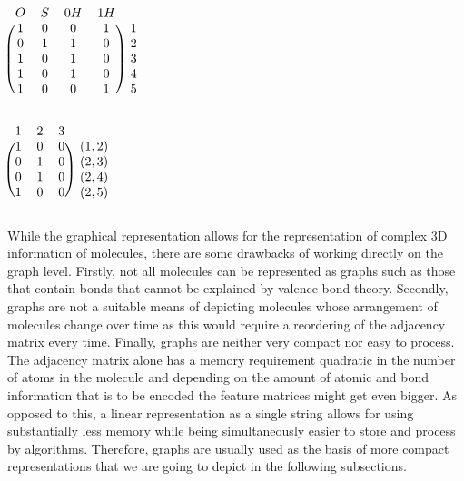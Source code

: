 \begin{minipage}{0.45\textwidth}
	\centering
	$
	\begin{blockarray}{ccccc}
	O & S & 0H & 1H  \\
	\begin{block}{(cccc)c}
	1 & 0 & 0 & 1 &  1 \\
	0 & 1 & 1 & 0 & 2 \\
	1 & 0 & 1 & 0 &  3 \\
	1 & 0 & 1 & 0 &  4 \\
	1 & 0 & 0 & 1 &  5 \\
	\end{block}
	\end{blockarray}
	$
	\label{fig:mol_node_feature_matrix}
\end{minipage}
\hfill
\begin{minipage}{0.45\textwidth}
	\vspace{.1cm}
	\centering
	$
	\begin{blockarray}{cccc}
	1 & 2 & 3  \\
	\begin{block}{(ccc)c}
	1 & 0 & 0 &  (1,2) \\
	0 & 1 & 0 &  (2,3) \\
	0 & 1 & 0 &  (2,4) \\
	1 & 0 & 0 &  (2,5) \\
	\end{block}
	\end{blockarray}
	$
	\label{fig:mol_edge_feature_matrix}
\end{minipage}
\newline\newline
While the graphical representation allows for the representation of complex 3D information of molecules, there are some drawbacks of working directly on the graph level. Firstly, not all molecules can be represented as graphs \citep{molrep} such as those that contain bonds that cannot be explained by valence bond theory. Secondly, graphs are not a suitable means of depicting molecules whose arrangement of molecules change over time as this would require a reordering of the adjacency matrix every time. Finally, graphs are neither very compact nor easy to process. The adjacency matrix alone has a memory requirement quadratic in the number of atoms in the molecule and depending on the amount of atomic and bond information that is to be encoded the feature matrices might get even bigger. As opposed to this, a linear representation as a single string allows for using substantially less memory while being simultaneously easier to store and process by algorithms. Therefore, graphs are usually used as the basis of more compact representations that we are going to depict in the following subsections. 
